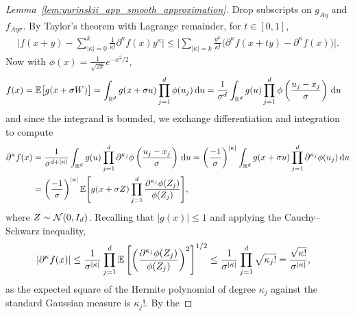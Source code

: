 \begin{proof}[Lemma~\ref{lem:yurinskii_app_smooth_approximation}]
  Drop subscripts on $g_{A\eta}$ and $f_{A \eta \sigma}$.
  By Taylor's theorem with Lagrange remainder, for $t \in [0,1]$,
  \begin{align*}
    \Bigg|
    f(x + y)
    - \sum_{|\kappa|=0}^{k}
    \frac{1}{\kappa!}
    \partial^{\kappa} f(x)
    y^\kappa
    \Bigg|
    \leq
    \Bigg|
    \sum_{|\kappa|=k}
    \frac{y^\kappa}{\kappa!}
    \big(
      \partial^{\kappa} f(x + t y)
      - \partial^{\kappa} f(x)
    \big)
    \Bigg|.
  \end{align*}
  Now with $\phi(x) = \frac{1}{\sqrt{2 \pi}} e^{-x^2/2}$,
  \begin{align*}
    f(x)
    &=
    \mathbb{E}\big[g(x + \sigma W) \big]
    =
    \int_{\mathbb{R}^d}
    g(x + \sigma u)
    \prod_{j=1}^{d}
    \phi(u_j)
    \,\mathrm{d}u
    =
    \frac{1}{\sigma^d}
    \int_{\mathbb{R}^d}
    g(u)
    \prod_{j=1}^{d}
    \phi \left( \frac{u_j-x_j}{\sigma} \right)
    \,\mathrm{d}u
  \end{align*}
  and since the integrand is bounded, we exchange differentiation and
  integration to compute
  \begin{align}
    \nonumber
    \partial^\kappa
    f(x)
    &=
    \frac{1}{\sigma^{d+|\kappa|}}
    \int_{\mathbb{R}^d}
    g(u)
    \prod_{j=1}^{d}
    \partial^{\kappa_j}
    \phi \left( \frac{u_j-x_j}{\sigma} \right)
    \,\mathrm{d}u
    = \left( \frac{-1}{\sigma} \right)^{|\kappa|}
    \int_{\mathbb{R}^d}
    g(x + \sigma u)
    \prod_{j=1}^{d}
    \partial^{\kappa_j}
    \phi(u_j)
    \,\mathrm{d}u \\
    \label{eq:yurinskii_app_smoothing_derivative}
    &=
    \left( \frac{-1}{\sigma} \right)^{|\kappa|}
    \mathbb{E} \Bigg[
      g(x + \sigma Z)
      \prod_{j=1}^{d}
      \frac{\partial^{\kappa_j}\phi(Z_j)}{\phi(Z_j)}
    \Bigg],
  \end{align}
  where $Z \sim \mathcal{N}(0, I_d)$.
  Recalling that $|g(x)| \leq 1$ and applying the Cauchy--Schwarz inequality,
  \begin{align*}
    \left|
    \partial^\kappa
    f(x)
    \right|
    &\leq
    \frac{1}{\sigma^{|\kappa|}}
    \prod_{j=1}^{d}
    \mathbb{E} \left[
      \left(
        \frac{\partial^{\kappa_j}\phi(Z_j)}{\phi(Z_j)}
      \right)^2
    \right]^{1/2}
    \leq
    \frac{1}{\sigma^{|\kappa|}}
    \prod_{j=1}^{d}
    \sqrt{\kappa_j!}
    =
    \frac{\sqrt{\kappa!}}{\sigma^{|\kappa|}},
  \end{align*}
  as the expected square of the Hermite polynomial of degree
  $\kappa_j$ against the standard Gaussian measure is $\kappa_j!$. By the

\end{proof}

